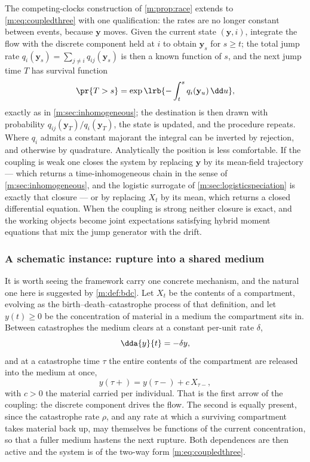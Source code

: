 The competing-clocks construction of \cref{m:prop:race} extends to
\cref{m:eq:coupledthree} with one qualification: the rates are no longer constant
between events, because $\mathbf y$ moves. Given the current state
$(\mathbf y,i)$, integrate the flow with the discrete component held at $i$ to
obtain $\mathbf y_s$ for $s\ge t$; the total jump rate
$q_i(\mathbf y_s)=\sum_{j\neq i}q_{ij}(\mathbf y_s)$ is then a known function of
$s$, and the next jump time $T$ has survival function
\begin{equation}
\label{m:eq:coupledholding}
\pr{T>s} = \exp\lrb{-\int_t^{s}q_i(\mathbf y_u)\,\dd u} ,
\end{equation}
exactly as in \cref{m:sec:inhomogeneous}; the destination is then drawn with
probability $q_{ij}(\mathbf y_T)/q_i(\mathbf y_T)$, the state is updated, and the
procedure repeats. Where $q_i$ admits a constant majorant the integral can be
inverted by rejection, and otherwise by quadrature. Analytically the position is
less comfortable. If the coupling is weak one closes the system by replacing
$\mathbf y$ by its mean-field trajectory --- which returns a time-inhomogeneous
chain in the sense of \cref{m:sec:inhomogeneous}, and the logistic surrogate of
\cref{m:sec:logisticspeciation} is exactly that closure --- or by replacing $X_t$
by its mean, which returns a closed differential equation. When the coupling is
strong neither closure is exact, and the working objects become joint
expectations satisfying hybrid moment equations that mix the jump generator with
the drift.

\subsubsection{A schematic instance: rupture into a shared medium}
\label{m:sec:coupledexample}

It is worth seeing the framework carry one concrete mechanism, and the natural
one here is suggested by \cref{m:def:bdc}. Let $X_t$ be the contents of a
compartment, evolving as the birth--death--catastrophe process of that
definition, and let $y(t)\ge0$ be the concentration of material in a medium the
compartment sits in. Between catastrophes the medium clears at a constant
per-unit rate $\delta$,
\begin{equation}
\label{m:eq:mediumdecay}
\dda{y}{t} = -\delta y ,
\end{equation}
and at a catastrophe time $\tau$ the entire contents of the compartment are
released into the medium at once,
\begin{equation}
\label{m:eq:mediumjump}
y(\tau+) = y(\tau-) + c\,X_{\tau-} ,
\end{equation}
with $c>0$ the material carried per individual. That is the first arrow of the
coupling: the discrete component drives the flow. The second is equally present,
since the catastrophe rate $\rho$, and any rate at which a surviving compartment
takes material back up, may themselves be functions of the current concentration,
so that a fuller medium hastens the next rupture. Both dependences are then
active and the system is of the two-way form \cref{m:eq:coupledthree}.

